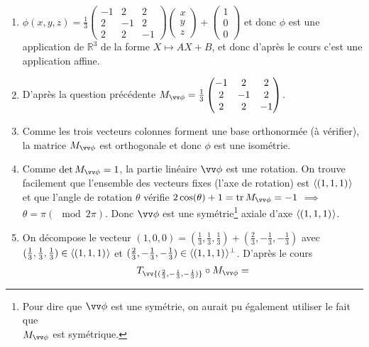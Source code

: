 \documentclass[a4paper,12pt,reqno]{amsart}
\begin{document}
\begin{solution}

  \begin{enumerate}
    \item $\phi(x,y,z) = \frac{1}{3}
          \begin{pmatrix}
            -1 &  2 &  2 \\
             2 & -1 &  2 \\
             2 &  2 & -1
          \end{pmatrix}
          \begin{pmatrix} x\\ y\\ z\end{pmatrix}
          +
          \begin{pmatrix} 1\\ 0\\ 0\end{pmatrix}
        $ et donc $\phi$ est une application de $\mathbb{R}^{3}$ de la forme $X\mapsto AX+B$, et donc d'après le cours c'est une application affine.
    \item D'après la question précédente $M_{\vv\phi} = \frac{1}{3}
          \begin{pmatrix}
            -1 &  2 &  2 \\
             2 & -1 &  2 \\
             2 &  2 & -1
          \end{pmatrix}
          $.
    \item Comme les trois vecteurs colonnes forment une base orthonormée (à vérifier), la matrice $M_{\vv\phi}$ est orthogonale et donc $\phi$ est une isométrie.
    \item Comme $\det M_{\vv\phi} = 1$, la partie linéaire $\vv\phi$ est une rotation. On trouve facilement que l'ensemble des vecteurs fixes (l'axe de rotation) est $\langle{(1,1,1)}\kern.07em\rangle$ et que l'angle de rotation $\theta$ vérifie $2\cos(\theta)+1 = \tr M_{\vv\phi} = -1$ $\implies$ $\theta = \pi (\mod 2\pi)$. Donc $\vv\phi$ est une symétrie\footnote{Pour dire que $\vv\phi$ est une symétrie, on aurait pu également utiliser le fait que\\ $M_{\vv\phi}$ est symétrique.} axiale d'axe $\langle{(1,1,1)}\kern.07em\rangle$.
    \item On décompose le vecteur $(1,0,0) = (\frac13,\frac13,\frac13)+(\frac23,-\frac13,-\frac13)$ avec $(\frac13,\frac13,\frac13) \in \langle{(1,1,1)}\kern.07em\rangle$ et $(\frac23,-\frac13,-\frac13) \in \langle{(1,1,1)}\kern.07em\rangle^{\perp}$. D'après le cours
      \[
        T_{\vv{(\frac23,-\frac13,-\frac13)}}\circ M_{\vv\phi} =
\]
\end{enumerate}
\end{solution}
\end{document}
